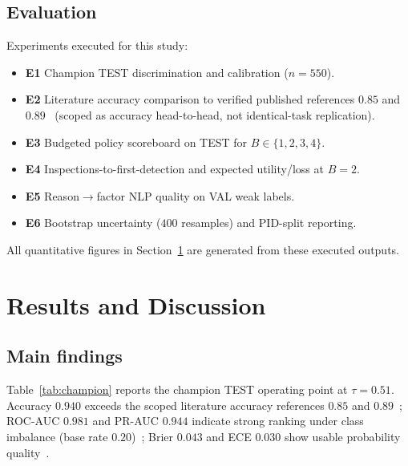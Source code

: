 \documentclass[journal]{IEEEtran}
\begin{document}
\subsection{Evaluation}
Experiments executed for this study:
\begin{itemize}
\item \textbf{E1} Champion TEST discrimination and calibration ($n{=}550$).
\item \textbf{E2} Literature accuracy comparison to verified published references $0.85$ and $0.89$~\cite{Khodabakhshian2025,Tagharobi2025} (scoped as accuracy head-to-head, not identical-task replication).
\item \textbf{E3} Budgeted policy scoreboard on TEST for $B\in\{1,2,3,4\}$.
\item \textbf{E4} Inspections-to-first-detection and expected utility/loss at $B{=}2$.
\item \textbf{E5} Reason$\rightarrow$factor NLP quality on VAL weak labels.
\item \textbf{E6} Bootstrap uncertainty ($400$ resamples) and PID-split reporting.
\end{itemize}
All quantitative figures in Section~\ref{sec:results} are generated from these executed outputs.

\section{Results and Discussion}
\label{sec:results}

\subsection{Main findings}
Table~\ref{tab:champion} reports the champion TEST operating point at $\tau{=}0.51$. Accuracy $0.940$ exceeds the scoped literature accuracy references $0.85$ and $0.89$~\cite{Khodabakhshian2025,Tagharobi2025}; ROC-AUC $0.981$ and PR-AUC $0.944$ indicate strong ranking under class imbalance (base rate $0.20$)~\cite{Saito2015,Hand2009}; Brier $0.043$ and ECE $0.030$ show usable probability quality~\cite{Brier1950,Gneiting2007}.
\end{document}
